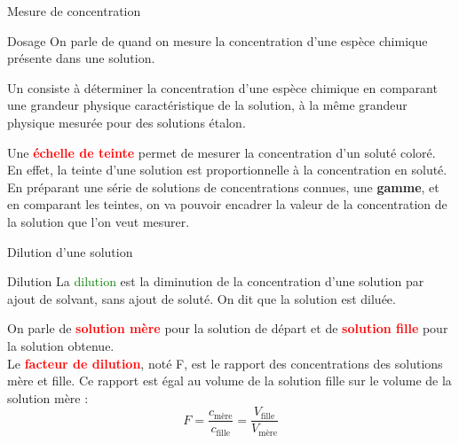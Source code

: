\begin{doc}{Mesure de concentration}
  \label{doc:dosage}
  \vspace*{-24pt}
  \begin{definition}{Dosage}
    On parle de  quand on mesure la concentration d'une espèce chimique présente dans une solution.
    
    Un  consiste à déterminer la concentration d’une espèce chimique en comparant une grandeur physique caractéristique de la solution, à la même grandeur physique mesurée pour des solutions étalon.
  \end{definition}
  
 Une \textcolor{red}{\textbf{échelle de teinte} }permet de mesurer la concentration d'un soluté coloré. En effet, la teinte d'une solution est proportionnelle à la concentration en soluté.
  En préparant une série de solutions de concentrations connues, une \textbf{gamme}, et en comparant les teintes, on va pouvoir encadrer la valeur de la concentration de la solution que l'on veut mesurer.
  
  \bigskip
  
\end{doc}
 

\begin{doc}{Dilution d'une solution}
  \label{doc:dilution}
  \vspace*{-24pt}
  \begin{definition}{Dilution}
La \textcolor{green}{dilution} est la diminution de la concentration d'une solution par ajout de solvant, sans ajout de soluté. On dit que la solution est diluée.
  \end{definition}
  On parle de \textcolor{red}{\textbf{solution mère}} pour la solution de départ et de \textcolor{red}{\textbf{solution fille}} pour la solution obtenue.\\
  Le \textcolor{red}{\textbf{facteur de dilution}}, noté F, est le rapport des concentrations des solutions mère et fille. Ce rapport est égal au volume de la solution fille sur le volume de la solution mère : 
  \begin{equation*}
    F = \frac{c_\text{mère}}{c_\text{fille}}
      = \frac{V_\text{fille}}{V_\text{mère}}
  \end{equation*}
\end{doc}


